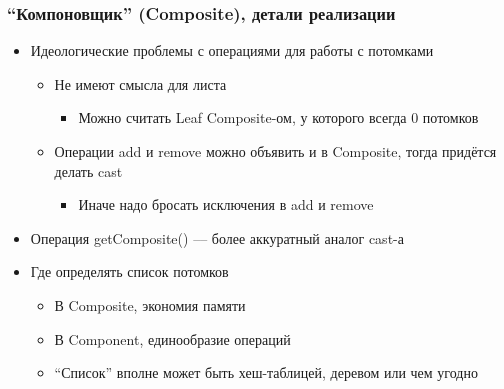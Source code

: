 \documentclass{../../slides-style}
\begin{document}
    \begin{frame}
        \frametitle{``Компоновщик'' (Composite), детали реализации}
        \begin{itemize}
            \item Идеологические проблемы с операциями для работы с потомками
            \begin{itemize}
                \item Не имеют смысла для листа
                \begin{itemize}
                    \item Можно считать Leaf Composite-ом, у которого всегда 0 потомков
                \end{itemize}
                \item Операции add и remove можно объявить и в Composite, тогда придётся делать cast
                \begin{itemize}
                    \item Иначе надо бросать исключения в add и remove
                \end{itemize}
            \end{itemize}
            \item Операция getComposite() –-- более аккуратный аналог cast-а
            \item Где определять список потомков
            \begin{itemize}
                \item В Composite, экономия памяти
                \item В Component, единообразие операций
                \item ``Список'' вполне может быть хеш-таблицей, деревом или чем угодно
            \end{itemize}
        \end{itemize}
    \end{frame}
\end{document}
